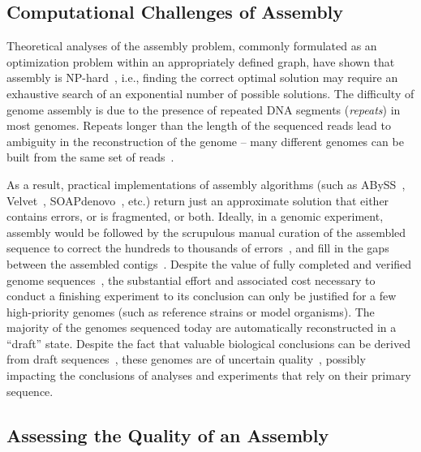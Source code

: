 \subsection{Computational Challenges of Assembly}

Theoretical analyses of the assembly problem, commonly formulated as
an optimization problem within an appropriately defined graph, have
shown that assembly is
NP-hard~\cite{myers1995,medvedev2007computability}, i.e., finding the
correct optimal solution may require an exhaustive search of an
exponential number of possible solutions.  The difficulty of genome
assembly is due to the presence of repeated DNA
segments (\emph{repeats}) in most genomes. Repeats longer than the length of the sequenced reads lead to ambiguity in the reconstruction of the genome
-- many different genomes can be built from the same set of
reads~\cite{nagarajan2009complexity,kingsford2010assembly}.

As a result, practical implementations of assembly algorithms (such as
ABySS~\cite{ABySS}, Velvet~\cite{Velvet},
SOAPdenovo~\cite{SOAPdenovo}, etc.) return just an approximate
solution that either contains errors, or is fragmented, or both.
Ideally, in a genomic experiment, assembly would be followed by the
scrupulous manual curation of the assembled sequence to correct the
hundreds to thousands of errors~\cite{salzberg2005misassemblies}, and
fill in the gaps between the assembled
contigs~\cite{nagarajan2010finishing}. Despite the value of fully
completed and verified genome sequences~\cite{fraser2002value}, the
substantial effort and associated cost necessary to conduct a
finishing experiment to its conclusion can only be justified for a
few high-priority genomes (such as reference strains or model
organisms). The majority of the genomes sequenced today are
automatically reconstructed in a ``draft'' state.  Despite the fact
that valuable biological conclusions can be derived from draft
sequences~\cite{branscomb2002high}, these genomes are of uncertain
quality~\cite{chain2009genome}, possibly impacting the conclusions of
analyses and experiments that rely on their primary sequence.

\subsection{Assessing the Quality of an Assembly}

